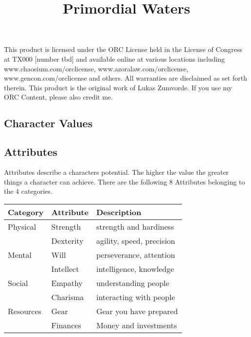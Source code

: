 \documentclass[11pt]{article}
\date{}
\title{Primordial Waters}
\begin{document}
\maketitle
{

\begin{tiny} This product is licensed under the ORC License held in the License of Congress at TX000 [number tbd] and available online at various locations including www.chaosium.com/orclicense, www.azoralaw.com/orclicense, www.gencon.com/orclicense and others. All warranties are disclaimed as set forth therein. This product is the original work of Lukas Zumvorde. If you use my ORC Content, please also credit me. \end{tiny}
\begin{multicols}{2}[]





\section{Character Values}
\label{sec:orgfec0e73}
\subsection{Attributes}
\label{sec:org0b405e0}
Attributes describe a characters potential. The higher the value the greater things a character can achieve. There are the following 8 Attributes belonging to the 4 categories.

\begin{center}
\begin{tabular}{lll}
\textbf{Category} & \textbf{Attribute} & \textbf{Description}\\
\hline
Physical & Strength & strength and hardiness\\
 & Dexterity & agility, speed, precision\\
\hline
Mental & Will & perseverance, attention\\
 & Intellect & intelligence, knowledge\\
\hline
Social & Empathy & understanding people\\
 & Charisma & interacting with people\\
\hline
Resources & Gear & Gear you have prepared\\
 & Finances & Money and investments\\
\end{tabular}
\end{center}


\end{multicols}}
\end{document}
